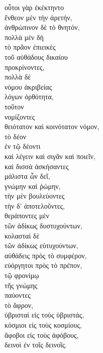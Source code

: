 {\large
\begin{greek}
\noindent οὗτοι γὰρ ἐκέκτηντο \\
ἔνθεον μὲν τὴν ἀρετήν, \\
ἀνθρώπινον δὲ τὸ θνητόν, \\
πολλὰ μὲν δὴ \\
\tabto{2em} τὸ πρᾶον ἐπιεικὲς \\
\tabto{2em} τοῦ αὐθάδους δικαίου \\
\tabto{4em} προκρίνοντες, \\
πολλὰ δὲ \\
\tabto{2em} νόμου ἀκριβείας \\
\tabto{2em} λόγων ὀρθότητα, \\
τοῦτον\\
\tabto{2em} νομίζοντες \\
θειότατον καὶ κοινότατον νόμον, \\
\tabto{4em} τὸ δέον \\
\tabto{4em} ἐν τῷ δέοντι \\
\tabto{4em} καὶ λέγειν καὶ σιγᾶν καὶ ποιεῖν, \\
καὶ δισσὰ ἀσκήσαντες \\
\tabto{2em} μάλιστα ὧν δεῖ, \\
\tabto{4em} γνώμην καὶ ῥώμην, \\
\tabto{6em} τὴν μὲν βουλεύοντες \\
\tabto{6em} τὴν δ' ἀποτελοῦντες, \\
θεράποντες μὲν \\
\tabto{2em} τῶν ἀδίκως δυστυχούντων, \\
κολασταὶ δὲ \\
\tabto{2em} τῶν ἀδίκως εὐτυχούντων, \\
αὐθάδεις πρὸς τὸ συμφέρον, \\
εὐόργητοι πρὸς τὸ πρέπον, \\
\tabto{2em} τῷ φρονίμῳ \\
\tabto{4em} τῆς γνώμης \\
παύοντες \\
\tabto{2em} τὸ ἄφρον, \\
ὑβρισταὶ εἰς τοὺς ὑβριστάς, \\
κόσμιοι εἰς τοὺς κοσμίους, \\
ἄφοβοι εἰς τοὺς ἀφόβους, \\
δεινοὶ ἐν τοῖς δεινοῖς. \\

\end{greek}
}

